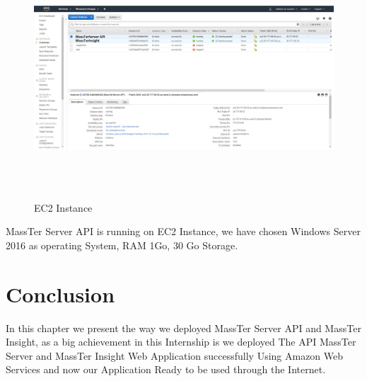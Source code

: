 	 \begin{figure}[!h]
		\centering
		\includegraphics[width=17cm,height=9cm]{ec2Instance.png}
		\caption{EC2 Instance}	
	\end{figure} 

	MassTer Server API is running on EC2 Instance, we have chosen Windows Server 2016 as operating System, RAM 1Go, 30 Go Storage. 

	\section{Conclusion}
	In this chapter we present the way we deployed MassTer Server API and MassTer Insight, as a big achievement in this Internship is we  deployed The API MassTer Server and MassTer Insight Web Application successfully Using Amazon Web Services and now our Application Ready to be used through the Internet.